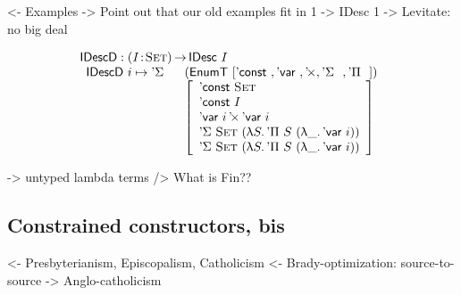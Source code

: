 \documentclass[preprint, authoryear]{sigplanconf}
\newenvironment{structure}{\footnotesize\verbatim}{\endverbatim}
\begin{document}
\begin{structure}
<- Examples
    -> Point out that our old examples fit in 1 -> IDesc 1
    -> Levitate: no big deal
\end{structure}

\[\stk{
\IDescD : \PI{\V{I}}{\Set} \IDesc{I} \\
\begin{array}{ll}
\IDescD~i \mapsto \DSigma{}{} & (\EnumT [ \DConst{},
                                          \DVar{},
                                          \DProd{}{},
                                          \DSigma{}{}, 
                                          \DPi{}{} ]) \\
                              & \left[\begin{array}{l}
                                      \DConst{\Set}               \\
                                      \DConst{I}                  \\
                                      \DProd{\DVar{i}}{\DVar{i}}  \\
                                      \DSigma{\Set}{(\LAM{S} \DPi{S}{(\LAM{\_} \DVar{i})})} \\
                                      \DSigma{\Set}{(\LAM{S} \DPi{S}{(\LAM{\_} \DVar{i})})}
                                   \end{array}
                             \right]
\end{array}
}\]

\begin{structure}
    -> untyped lambda terms
        /> What is Fin??
\end{structure}

\subsection{Constrained constructors, bis}

\begin{structure}
<- Presbyterianism, Episcopalism, Catholicism
<- Brady-optimization: source-to-source
    -> Anglo-catholicism
\end{structure}


\end{document}
